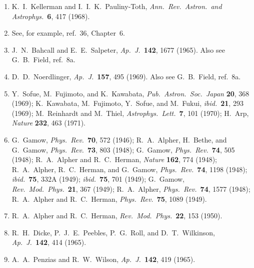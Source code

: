 \begin{enumerate}
  \item[49a.]\label{ch15-ref-49a}
  K.~I.~Kellerman and I.~I.~K.~Pauliny-Toth,
  \emph{Ann.\ Rev.\ Astron.\ and Astrophys.}\ \textbf{6}, 417 (1968).

  \item{}\label{ch15-ref-50}
  See, for example, ref.~36, Chapter~6.

  \item[50a.]\label{ch15-ref-50a}
  J.~N.~Bahcall and E.~E.~Salpeter,
  \emph{Ap.\ J.}\ \textbf{142}, 1677 (1965).
  Also see G.~B.~Field, ref.~8a.

  \item[50b.]\label{ch15-ref-50b}
  D.~D.~Noerdlinger, \emph{Ap.\ J.}\ \textbf{157}, 495 (1969).
  Also see G.~B.~Field, ref.~8a.

  \item[50c.]\label{ch15-ref-50c}
  Y.~Sofue, M.~Fujimoto, and K.~Kawabata,
  \emph{Pub.\ Astron.\ Soc.\ Japan} \textbf{20}, 368 (1969);
  K.~Kawabata, M.~Fujimoto, Y.~Sofue, and M.~Fukui,
  \emph{ibid.}\ \textbf{21}, 293 (1969);
  M.~Reinhardt and M.~Thiel, \emph{Astrophys.\ Lett.}\ \textbf{7},
  101 (1970); H.~Arp, \emph{Nature} \textbf{232}, 463 (1971).

  \item{}\label{ch15-ref-51}
  G.~Gamow, \emph{Phys.\ Rev.}\ \textbf{70}, 572 (1946);
  R.~A.~Alpher, H.~Bethe, and G.~Gamow,
  \emph{Phys.\ Rev.}\ \textbf{73}, 803 (1948);
  G.~Gamow, \emph{Phys.\ Rev.}\ \textbf{74}, 505 (1948);
  R.~A.~Alpher and R.~C.~Herman, \emph{Nature} \textbf{162}, 774 (1948);
  R.~A.~Alpher, R.~C.~Herman, and G.~Gamow,
  \emph{Phys.\ Rev.}\ \textbf{74}, 1198 (1948);
  \emph{ibid.}\ \textbf{75}, 332A (1949);
  \emph{ibid.}\ \textbf{75}, 701 (1949);
  G.~Gamow, \emph{Rev.\ Mod.\ Phys.}\ \textbf{21}, 367 (1949);
  R.~A.~Alpher, \emph{Phys.\ Rev.}\ \textbf{74}, 1577 (1948);
  R.~A.~Alpher and R.~C.~Herman,
  \emph{Phys.\ Rev.}\ \textbf{75}, 1089 (1949).

  \item{}\label{ch15-ref-52}
  R.~A.~Alpher and R.~C.~Herman,
  \emph{Rev.\ Mod.\ Phys.}\ \textbf{22}, 153 (1950).

  \item{}\label{ch15-ref-53}
  R.~H.~Dicke, P.~J.~E.~Peebles, P.~G.~Roll, and D.~T.~Wilkinson,
  \emph{Ap.\ J.}\ \textbf{142}, 414 (1965).

  \item{}\label{ch15-ref-54}
  A.~A.~Penzias and R.~W.~Wilson,
  \emph{Ap.\ J.}\ \textbf{142}, 419 (1965).


\end{enumerate}
